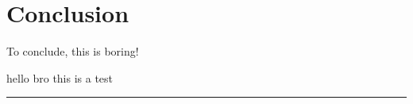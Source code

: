 \documentclass[5p,sort&compress]{elsarticle}
\begin{document}
\section{Conclusion}

\noindent To conclude, this is boring!


hello bro this is a test




\begingroup
\begin{center}
  \rule{2cm}{.4pt}
\end{center}
\makeatletter
{}
\makeatother



\endgroup
\end{document}
